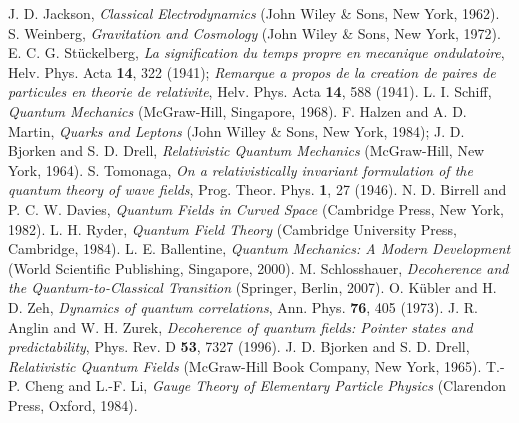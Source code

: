 \documentclass[12pt,twoside]{report} %
\begin{document}
\begin{thebibliography}{99}
J. D. Jackson, {\it Classical Electrodynamics} (John Wiley \& Sons, New York, 1962).
S. Weinberg, {\it Gravitation and Cosmology} (John Wiley \& Sons, New York, 1972).
E. C. G. St\"uckelberg, {\it La signification du temps propre en mecanique ondulatoire}, 
Helv. Phys. Acta {\bf 14}, 322 (1941);
{\it Remarque a propos de la creation de paires de particules en theorie de relativite}, 
Helv. Phys. Acta {\bf 14}, 588 (1941).
L. I. Schiff, {\it Quantum Mechanics} (McGraw-Hill, Singapore, 1968).
F. Halzen and A. D. Martin, {\it Quarks and Leptons} (John Willey \& Sons, New York, 1984);
J. D. Bjorken and S. D. Drell, {\it Relativistic Quantum Mechanics} 
(McGraw-Hill, New York, 1964).
S. Tomonaga, {\it On a relativistically invariant formulation of the quantum theory of wave fields}, 
Prog. Theor. Phys. {\bf 1}, 27 (1946).
N. D. Birrell and P. C. W. Davies, {\it Quantum Fields in Curved Space}
(Cambridge Press, New York, 1982).
L. H. Ryder, {\it Quantum Field Theory} (Cambridge University Press, Cambridge, 1984).
L. E. Ballentine, {\it Quantum Mechanics: A Modern Development}
(World Scientific Publishing, Singapore, 2000).
M. Schlosshauer, {\it Decoherence and the Quantum-to-Classical Transition}
(Springer, Berlin, 2007).
O. K\"ubler and H. D. Zeh, {\it Dynamics of quantum correlations}, Ann. Phys. {\bf 76}, 405 (1973).
J. R. Anglin and W. H. Zurek, {\it Decoherence of quantum fields: Pointer states and predictability}, 
Phys. Rev. D {\bf 53}, 7327 (1996).
J. D. Bjorken and S. D. Drell, {\it Relativistic Quantum Fields}
(McGraw-Hill Book Company, New York, 1965).
T.-P. Cheng and L.-F. Li, {\it Gauge Theory of Elementary Particle Physics}
(Clarendon Press, Oxford, 1984).







\end{thebibliography}


\end{document}
